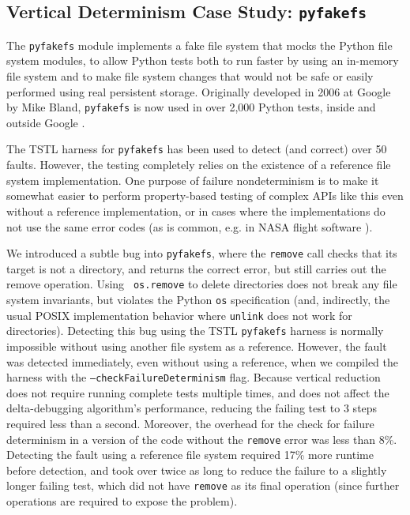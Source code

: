 \subsection {Vertical Determinism Case Study: {\tt pyfakefs}}

The {\tt pyfakefs} \cite{pyfakefs} module implements a fake file
system that mocks the Python file system modules, to allow Python
tests both to run faster by using an in-memory file system and to make
file system changes that would not be safe or easily performed using
real persistent storage.  Originally developed in 2006 at Google by
Mike Bland, {\tt pyfakefs} is now used in over 2,000 Python tests,
inside and outside Google \cite{pyfakefs}.

The TSTL harness for {\tt pyfakefs} has been used to detect (and
correct) over 50 faults.  However, the testing completely relies on
the existence of a reference file system implementation.  One purpose
of failure nondeterminism is to make it somewhat easier to perform
property-based testing of
complex APIs like this even without a reference implementation, or in cases
where the implementations do not use the same error
codes (as is common, e.g. in NASA flight software
\cite{ICSEDiff,CFV08}).

We introduced a subtle bug into {\tt pyfakefs}, where the {\tt remove}
call checks that its target is not a directory, and returns the
correct error, but still carries out the remove operation.  Using {\tt
  os.remove} to delete directories does not break any file system
invariants, but violates the Python {\tt os} specification (and,
indirectly, the usual POSIX implementation behavior where {\tt unlink}
does not work for directories).  Detecting this bug using the TSTL
{\tt pyfakefs} harness is normally impossible without using another
file system as a reference.  However, the fault was detected
immediately, even without using a reference, when we compiled the harness
with the {\tt --checkFailureDeterminism} flag.  Because vertical
reduction does not require running complete tests multiple times, and
does not affect the delta-debugging algorithm's performance, reducing
the failing test to 3 steps required less than a second.
Moreover, the overhead for the check for failure determinism in a
version of the code without the {\tt remove} error was
less than 8\%.  Detecting the fault using a reference file system 
required 17\% more runtime before detection, and took over twice as
long to reduce the failure to a
slightly longer failing test, which did not have {\tt remove} as its
final operation (since further operations are required to 
expose the problem).

